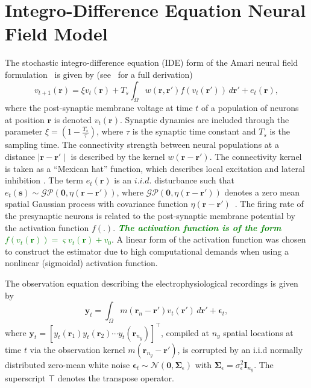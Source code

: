 \documentclass[journal,a4paper]{IEEEtran}
\newcommand{\dean}[1]{\textsf{\emph{\textbf{\textcolor{green}{#1}}}}}
\begin{document}
\section{Integro-Difference Equation Neural Field Model}
The stochastic integro-difference equation (IDE) form of the Amari neural field  formulation~\cite{Amari1977} is given by (see~\cite{Freestone2011} for a full derivation)
\begin{equation}\label{eq:DiscreteTimeModel}
	v_{t+1}\left(\mathbf{r}\right) = 
	\xi v_t\left(\mathbf{r}\right) + 
	T_s \int_\Omega { 
	    w\left(\mathbf{r},\mathbf{r'}\right)
	    f\left(v_t\left(\mathbf{r}'\right)\right) 
	\, d\mathbf{r}'} 
	+ e_t\left(\mathbf{r}\right), 
\end{equation}
where the post-synaptic membrane voltage at time $t$ of a population of neurons at position $\mathbf r$ is denoted $v_t\left(\mathbf r\right)$. Synaptic dynamics are included through the parameter $\xi=\left(1-\frac{ T_s}{\tau}\right)$, where $\tau$ is the synaptic time constant and $T_s$ is the sampling time. The connectivity strength between neural populations at a distance $\mid\mathbf{r}-\mathbf{r'}\mid$ is described by the kernel $w\left(\mathbf{r}-\mathbf{r}'\right)$. The connectivity kernel is taken as a ``Mexican hat'' function, which describes local excitation and lateral inhibition \cite{Amari1977}. The term $e_t(\mathbf r)$ is an $i.i.d.$ disturbance such that $e_t(\mathbf{s})\sim\mathcal{GP}(\mathbf 0,\eta(\mathbf{r}-\mathbf{r'}))$, where $\mathcal{GP}(\mathbf 0,\eta(\mathbf{r}-\mathbf{r'}))$  denotes a zero mean spatial Gaussian process with covariance function $\eta(\mathbf{r}-\mathbf{r'})$~\cite{Rasmussen2005}. The firing rate of the presynaptic neurons is related to the post-synaptic membrane potential by the activation function $f\left(.\right)$. \dean{The activation function is of the form $f(v_t(\mathbf{r})) = \varsigma v_t(\mathbf{r}) + v_0$}. A linear form of the activation function was chosen to construct the estimator due to high computational demands when using a nonlinear (sigmoidal) activation function.

The observation equation describing the electrophysiological recordings is given by 
\begin{equation}\label{eq:ObservationEquation}
	\mathbf y_t = \int_{\Omega} { m\left(\mathbf{r}_{n}-\mathbf{r}'\right) v_t\left(\mathbf{r}'\right) \, d\mathbf{r}'} + \boldsymbol\epsilon_t, 
\end{equation}
where $\mathbf{y}_{t} = [y_t(\mathbf{r}_1) y_t(\mathbf{r}_2) \cdots y_t(\mathbf{r}_{n_y})]^\top$, compiled at $n_{y}$ spatial locations at time $t$ via the observation kernel $m\left(\mathbf{r}_{n_y}-\mathbf{r}'\right)$, is corrupted by an i.i.d normally distributed zero-mean white noise $\boldsymbol{\epsilon}_{t}\sim \mathcal{N}\left(\mathbf{0},\mathbf{\Sigma}_{\epsilon}\right)$ with $\mathbf{\Sigma}_{\epsilon}=\sigma_{\epsilon}^2\mathbf I_{n_y} $. The superscript $\top$ denotes the transpose operator.
\end{document}
